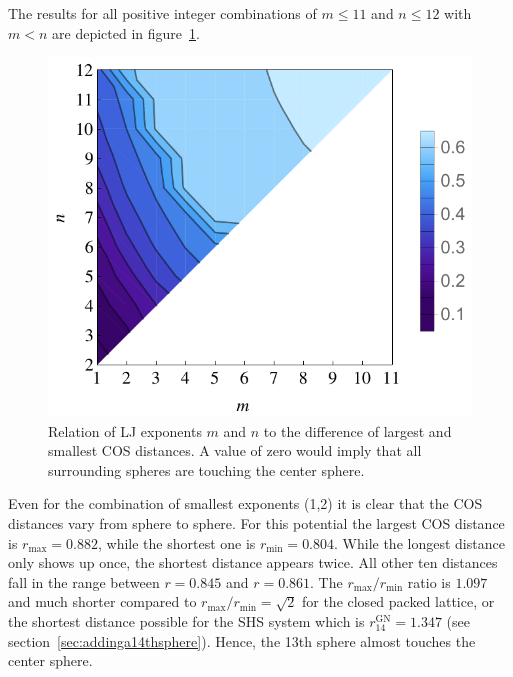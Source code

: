 The results for all positive integer combinations of $m\leq11$ and $n\leq12$
with $m<n$ are depicted in figure~\ref{fig:gregorynewton-N14}. 
%
\begin{figure}[htb]
    \centering
    \includegraphics[width=.8\textwidth]{gregory-newton/N14.pdf}
    \caption{Relation of \acs{LJ} exponents $m$ and $n$ to the difference of
    largest and smallest \acs{COS} distances.  A value of zero would imply that
    all surrounding spheres are touching the center sphere.}
    \label{fig:gregorynewton-N14}
\end{figure}
%
Even for the combination of smallest exponents (1,2) it is clear that the
\ac{COS} distances vary from sphere to sphere. For this potential the largest
\ac{COS} distance is $r_\text{max}=0.882$, while the shortest one is
$r_\text{min}=0.804$. While the longest distance only shows up once, the
shortest distance appears twice. All other ten distances fall in the range
between $r = 0.845$ and $r = 0.861$. The $r_\text{max} /r_\text{min}$ ratio is
$1.097$ and much shorter compared to $r_\text{max} /r_\text{min}= \sqrt{2}$ for
the closed packed lattice, or the shortest distance possible for the \ac{SHS}
system which is $r_{14}^\text{GN} = 1.347$ (see
section~\ref{sec:addinga14thsphere}). Hence, the 13th sphere almost touches the
center sphere.

